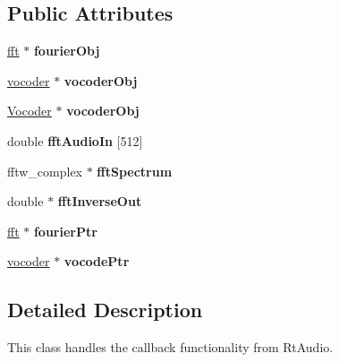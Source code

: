 \subsection*{Public Attributes}
\begin{DoxyCompactItemize}
\item 
\hypertarget{classdispatch_aa4276ec2461afbd1cb98fa4cd9721831}{\hyperlink{classfft}{fft} $\ast$ {\bfseries fourier\-Obj}}\label{classdispatch_aa4276ec2461afbd1cb98fa4cd9721831}

\item 
\hypertarget{classdispatch_a7ccec21b2dce1224744ccaa8d1cafee5}{\hyperlink{classvocoder}{vocoder} $\ast$ {\bfseries vocoder\-Obj}}\label{classdispatch_a7ccec21b2dce1224744ccaa8d1cafee5}

\item 
\hypertarget{classdispatch_a9a7c9726e0a90bdc0e2f2fddcd0ce151}{\hyperlink{classVocoder}{Vocoder} $\ast$ {\bfseries vocoder\-Obj}}\label{classdispatch_a9a7c9726e0a90bdc0e2f2fddcd0ce151}

\item 
\hypertarget{classdispatch_a4716a8409d8ae147bd9035c279fb5dc2}{double {\bfseries fft\-Audio\-In} \mbox{[}512\mbox{]}}\label{classdispatch_a4716a8409d8ae147bd9035c279fb5dc2}

\item 
\hypertarget{classdispatch_a687c3d15b82f8e36bf3aa8ef6b66d3b2}{fftw\-\_\-complex $\ast$ {\bfseries fft\-Spectrum}}\label{classdispatch_a687c3d15b82f8e36bf3aa8ef6b66d3b2}

\item 
\hypertarget{classdispatch_a718894cd35b744d2d6f24f391571c735}{double $\ast$ {\bfseries fft\-Inverse\-Out}}\label{classdispatch_a718894cd35b744d2d6f24f391571c735}

\item 
\hypertarget{classdispatch_a756411664d900bf1cf31e7626c57a4d4}{\hyperlink{classfft}{fft} $\ast$ {\bfseries fourier\-Ptr}}\label{classdispatch_a756411664d900bf1cf31e7626c57a4d4}

\item 
\hypertarget{classdispatch_ac5c5c76c34783dfc1a0e29935272e99f}{\hyperlink{classvocoder}{vocoder} $\ast$ {\bfseries vocode\-Ptr}}\label{classdispatch_ac5c5c76c34783dfc1a0e29935272e99f}

\end{DoxyCompactItemize}


\subsection{Detailed Description}
This class handles the callback functionality from Rt\-Audio. 


